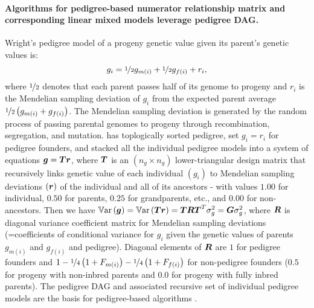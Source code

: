\paragraph{Algorithms for pedigree-based numerator relationship matrix and
corresponding linear mixed models leverage pedigree DAG.}
%
Wright's pedigree model of a progeny genetic value given its parent's
genetic values is:
%
\begin{equation} \label{eqn:wright_geno}
  g_i = \nicefrac{1}{2}g_{m(i)} + \nicefrac{1}{2}g_{f(i)} + r_i,
\end{equation}
%
where
$\nicefrac{1}{2}$ denotes that each parent passes half of its genome to
progeny and 
$r_i$ is the Mendelian sampling deviation of $g_i$ from the expected
parent average $\nicefrac{1}{2}\left(g_{m(i)} + g_{f(i)}\right)$.
%
The Mendelian sampling deviation is generated by the random process of 
passing parental genomes to progeny through recombination, segregation,
and mutation.
%
\cite{henderson1976simple} has toplogically sorted pedigree, set $g_i = r_i$
for pedigree founders, and stacked all the individual pedigree models into
a system of equations $\boldsymbol{g} = \boldsymbol{Tr}$,
where $\boldsymbol{T}$ is an $(n_g \times n_g)$ lower-triangular design
matrix that recursively links genetic value of each individual $(g_i)$ to
Mendelian sampling deviations $(\boldsymbol{r})$ of the individual and
all of its ancestors - with values $1.00$ for individual,
$0.50$ for parents, $0.25$ for grandparents, etc., and
$0.00$ for non-ancestors.
%
Then we have
$\mathbb{V}\text{ar}\left(\boldsymbol{g}\right) = \mathbb{V}\text{ar}\left(\boldsymbol{Tr}\right)
  = \boldsymbol{TRT}^T\sigma_g^2=\boldsymbol{G}\sigma_g^2$,
where $\boldsymbol{R}$ is diagonal variance coefficient matrix for
Mendelian sampling deviations (=coefficients of conditional variance for
$g_i$ given the genetic values of parents $g_{m(i)}$ and $g_{f(i)}$ and
pedigree).
%
Diagonal elements of $\boldsymbol{R}$ are $1$ for pedigree founders and
$1 - \nicefrac{1}{4}\left(1 + F_{m(i)}\right)
   - \nicefrac{1}{4}\left(1 + F_{f(i)}\right)$ for non-pedigree  founders
($0.5$ for progeny with non-inbred parents and $0.0$ for progeny with
fully inbred parents).
%
The pedigree DAG and associated recursive set of individual pedigree models
are the basis for pedigree-based algorithms
\citep{emik1949systematic, cruden1949computation,
henderson1976simple, quaas1976computing,
thompson1979sire, quaas1988additive,
meuwissen1992computing, tier1999computing, colleau2002indirect, sargolzaei2005fast,
mcpeek2004best, gengler2007simple, garciacortes2010fine, aguilar2011efficient,
stranden2020bpop, nilforooshan2021alternative}.
